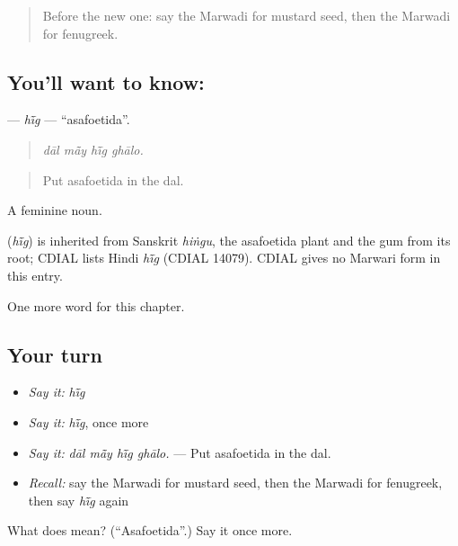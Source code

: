 \begin{quote}
Before the new one: say the Marwadi for mustard seed, then the Marwadi for fenugreek.
\end{quote}

\subsection*{You'll want to know: }
\textbf{} — \emph{hī̃g} — \textquotedblleft{}asafoetida\textquotedblright{}.

\begin{quote}
   
\end{quote}

\begin{quote}
\emph{dāl mā̃y hī̃g ghālo.}
\end{quote}

\begin{quote}
Put asafoetida in the dal.
\end{quote}

A feminine noun.

\begin{cousinweb}
\textbf{} (\emph{hī̃g}) is inherited from Sanskrit \emph{hiṅgu}, the asafoetida plant and the gum from its root; CDIAL lists Hindi \emph{hī̃g} (CDIAL 14079). CDIAL gives no Marwari form in this entry.
\end{cousinweb}

\begin{grammarlens}[title={What you've built}]
One more word for this chapter.
\end{grammarlens}

\subsection*{Your turn}
\begin{itemize}
\raggedright
  \item \emph{Say it:} \emph{hī̃g}
  \item \emph{Say it:} \emph{hī̃g}, once more
  \item \emph{Say it:} \emph{dāl mā̃y hī̃g ghālo.} — Put asafoetida in the dal.
  \item \emph{Recall:} say the Marwadi for mustard seed, then the Marwadi for fenugreek, then say \emph{hī̃g} again
\end{itemize}

\begin{tcolorbox}[breakable,colback=teal!4,colframe=teal!35!black,title={Before you move on}]
What does  mean? (\textquotedblleft{}Asafoetida\textquotedblright{}.) Say it once more.
\end{tcolorbox}
